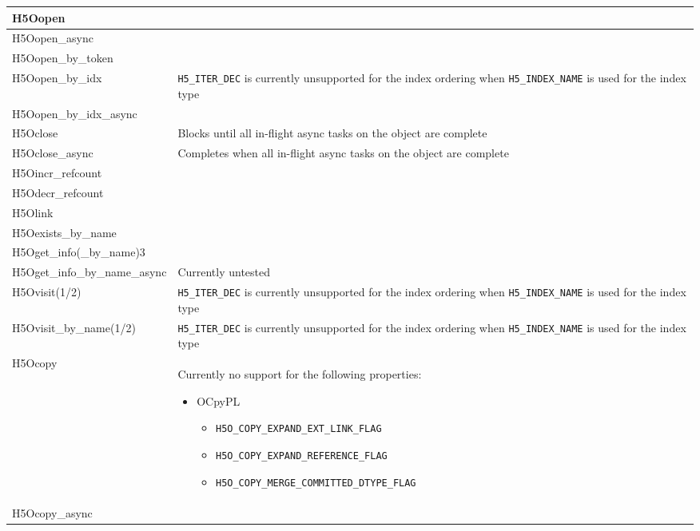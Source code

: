 \documentclass[../users_guide.tex]{subfiles}
\begin{document}
\begin{center}
\begin{tabularx}{\linewidth}{| X | >{\RaggedRight}X |}
H5Oopen & \\ \hline
H5Oopen\_async & \\ \hline
H5Oopen\_by\_token & \\ \hline
H5Oopen\_by\_idx & \texttt{H5\_ITER\_DEC} is currently unsupported for the index ordering when \texttt{H5\_INDEX\_NAME} is used for the index type\\ \hline
H5Oopen\_by\_idx\_async & \\ \hline
H5Oclose & Blocks until all in-flight async tasks on the object are complete\\ \hline
H5Oclose\_async & Completes when all in-flight async tasks on the object are complete\\ \hline
H5Oincr\_refcount & \\ \hline
H5Odecr\_refcount & \\ \hline
H5Olink & \\ \hline
H5Oexists\_by\_name & \\ \hline
H5Oget\_info(\_by\_name)3 & \\ \hline
H5Oget\_info\_by\_name\_async & Currently untested\\ \hline
H5Ovisit(1/2) & \texttt{H5\_ITER\_DEC} is currently unsupported for the index ordering when \texttt{H5\_INDEX\_NAME} is used for the index type\\ \hline
H5Ovisit\_by\_name(1/2) & \texttt{H5\_ITER\_DEC} is currently unsupported for the index ordering when \texttt{H5\_INDEX\_NAME} is used for the index type\\ \hline
H5Ocopy & Currently no support for the following properties: \begin{itemize}
                                                                 \setlength{\itemindent}{-1em}
                                                                 \item OCpyPL
                                                                 \begin{itemize}
                                                                     \setlength{\itemindent}{-2.5em}
                                                                     \item {\small\texttt{H5O\_COPY\_EXPAND\_EXT\_LINK\_FLAG}}\footnotemark[1]
                                                                     \item {\small\texttt{H5O\_COPY\_EXPAND\_REFERENCE\_FLAG}}\footnotemark[2]
                                                                     \item {\small\texttt{H5O\_COPY\_MERGE\_COMMITTED\_DTYPE\_FLAG}}
                                                                 \end{itemize}
                                                             \end{itemize}\\ \hline
H5Ocopy\_async & \\ \hline


\end{tabularx}
\end{center}
\end{document}
